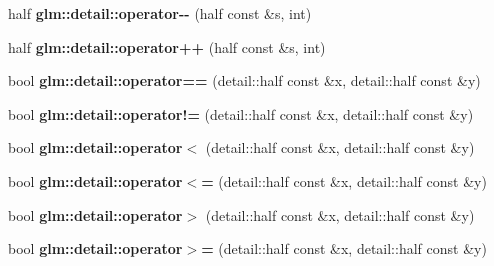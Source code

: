 \begin{DoxyCompactItemize}
\item 
\hypertarget{namespaceglm_1_1detail_a47c575836608a210c271d8e9ae4ce100}{half {\bfseries glm\-::detail\-::operator-\/-\/} (half const \&s, int)}\label{namespaceglm_1_1detail_a47c575836608a210c271d8e9ae4ce100}

\item 
\hypertarget{namespaceglm_1_1detail_a4249333cb751ad58be862ace76b9ca75}{half {\bfseries glm\-::detail\-::operator++} (half const \&s, int)}\label{namespaceglm_1_1detail_a4249333cb751ad58be862ace76b9ca75}

\item 
\hypertarget{namespaceglm_1_1detail_a06e2e65ba3b1b8fbf4bd36fa162d1291}{bool {\bfseries glm\-::detail\-::operator==} (detail\-::half const \&x, detail\-::half const \&y)}\label{namespaceglm_1_1detail_a06e2e65ba3b1b8fbf4bd36fa162d1291}

\item 
\hypertarget{namespaceglm_1_1detail_a3fe68870255106305088d5c273f70efa}{bool {\bfseries glm\-::detail\-::operator!=} (detail\-::half const \&x, detail\-::half const \&y)}\label{namespaceglm_1_1detail_a3fe68870255106305088d5c273f70efa}

\item 
\hypertarget{namespaceglm_1_1detail_a9f821b272dc39cf31c8a8038f17921f4}{bool {\bfseries glm\-::detail\-::operator$<$} (detail\-::half const \&x, detail\-::half const \&y)}\label{namespaceglm_1_1detail_a9f821b272dc39cf31c8a8038f17921f4}

\item 
\hypertarget{namespaceglm_1_1detail_a24edd3f0ef3858bc7ba1af612906ec9d}{bool {\bfseries glm\-::detail\-::operator$<$=} (detail\-::half const \&x, detail\-::half const \&y)}\label{namespaceglm_1_1detail_a24edd3f0ef3858bc7ba1af612906ec9d}

\item 
\hypertarget{namespaceglm_1_1detail_a4a0c4141412655598450614b54cd312d}{bool {\bfseries glm\-::detail\-::operator$>$} (detail\-::half const \&x, detail\-::half const \&y)}\label{namespaceglm_1_1detail_a4a0c4141412655598450614b54cd312d}

\item 
\hypertarget{namespaceglm_1_1detail_aed4ce34912db5756cc5f1e41227c8930}{bool {\bfseries glm\-::detail\-::operator$>$=} (detail\-::half const \&x, detail\-::half const \&y)}\label{namespaceglm_1_1detail_aed4ce34912db5756cc5f1e41227c8930}

\end{DoxyCompactItemize}


